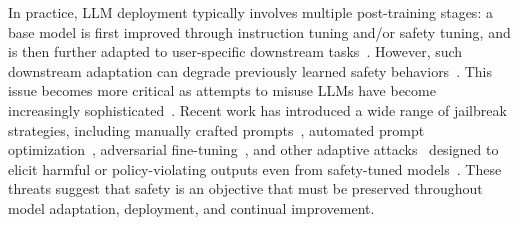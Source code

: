 \documentclass{article}
\newcommand{\kms}[1]{{\leavevmode\color{blue}[MS: #1]}}
\begin{document}
In practice, LLM deployment typically involves multiple post-training stages: a base model is first improved through instruction tuning and/or safety tuning, and is then further adapted to user-specific downstream tasks~\citep{ouyang2022training}. However, such downstream adaptation can degrade previously learned safety behaviors~\citep{lisa}. %
This issue becomes more critical as attempts to misuse LLMs have become increasingly sophisticated~\citep{yu2025infecting, li2025commercialllmagentsvulnerable, yang2024watch}. Recent work has introduced a wide range of jailbreak strategies, including manually crafted prompts~\citep{manual_prompt}, automated prompt optimization~\citep{advbench, autodan}, adversarial fine-tuning~\citep{adv_finetuning, shadow_finetuning}, and other adaptive attacks~\citep{pair, pap, liar} designed to elicit harmful or policy-violating outputs even from safety-tuned models~\citep{jailbroken}. These threats suggest that safety is an objective that must be preserved throughout model adaptation, deployment, and continual improvement.



\end{document}
